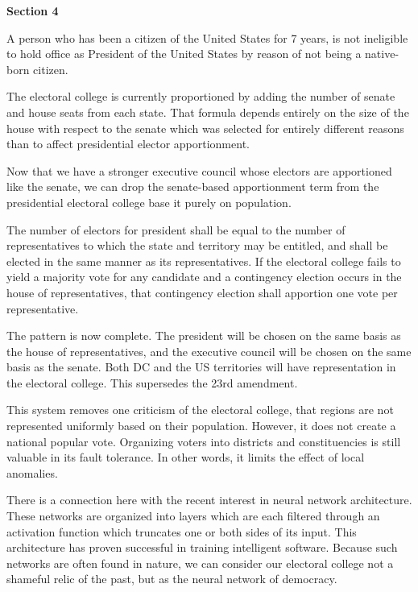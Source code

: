 \documentclass{article}
\begin{document}
\begin{quoting}
\textbf{Section 4}

A person who has been a citizen of the United States for 7 years, is not ineligible to hold office as President of the United States by reason of not being a native-born citizen.
\end{quoting}

The electoral college is currently proportioned by adding the number of senate and house seats from each state. That formula depends entirely on the size of the house with respect to the senate which was selected for entirely different reasons than to affect presidential elector apportionment.

Now that we have a stronger executive council whose electors are apportioned like the senate, we can drop the senate-based apportionment term from the presidential electoral college base it purely on population.

\begin{quoting}
The number of electors for president shall be equal to the number of representatives to which the state and territory may be entitled, and shall be elected in the same manner as its representatives. If the electoral college fails to yield a majority vote for any candidate and a contingency election occurs in the house of representatives, that contingency election shall apportion one vote per representative.
\end{quoting}

The pattern is now complete. The president will be chosen on the same basis as the house of representatives, and the executive council will be chosen on the same basis as the senate. Both DC and the US territories will have representation in the electoral college. This supersedes the 23rd amendment.

This system removes one criticism of the electoral college, that regions are not represented uniformly based on their population. However, it does not create a national popular vote. Organizing voters into districts and constituencies is still valuable in its fault tolerance. In other words, it limits the effect of local anomalies.

There is a connection here with the recent interest in neural network architecture. These networks are organized into layers which are each filtered through an activation function which truncates one or both sides of its input. This architecture has proven successful in training intelligent software. Because such networks are often found in nature, we can consider our electoral college not a shameful relic of the past, but as the neural network of democracy.
\end{document}
